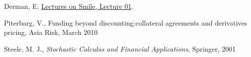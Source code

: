 \documentclass{amsart}
\theoremstyle{plain}
\numberwithin{equation}{section}
\begin{document}
\begin{thebibliography}{9}                                                                                                %
Derman, E. \href{http://www.emanuelderman.com/media/smile-lecture1.pdf}
{Lectures on Smile, Lecture 01}.

Piterbarg, V., Funding beyond discounting:collateral agreements and
derivatives pricing, Asia Risk, March 2010

Steele, M. J., \textit{Stochastic Calculus and Financial Applications}, 
Springer, 2001

\end{thebibliography}
\end{document}
